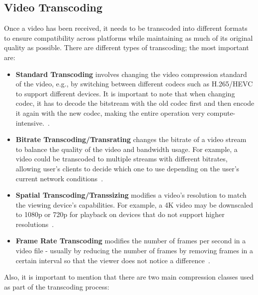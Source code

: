 \subsection{Video Transcoding}
Once a video has been received, it needs to be transcoded into different formats to ensure compatibility across platforms while maintaining as much of its original quality as possible. There are different types of transcoding; the most important are:

\begin{itemize}
    \item \textbf{Standard Transcoding} involves changing the video compression standard of the video, e.g., by switching between different codecs such as H.265/HEVC to support different devices. It is important to note that when changing codec, it has to decode the bitstream with the old codec first and then encode it again with the new codec, making the entire operation very compute-intensive.~\parencite{codec_transcoding}.
    \item \textbf{Bitrate Transcoding/Transrating} changes the bitrate of a video stream to balance the quality of the video and bandwidth usage. For example, a video could be transcoded to multiple streams with different bitrates, allowing user's clients to decide which one to use depending on the user's current network conditions~\parencite{transcoding}.
    \item \textbf{Spatial Transcoding/Transsizing} modifies a video's resolution to match the viewing device's capabilities. For example, a 4K video may be downscaled to 1080p or 720p for playback on devices that do not support higher resolutions~\parencite{cloud_streaming}.
    \item \textbf{Frame Rate Transcoding} modifies the number of frames per second in a video file - usually by reducing the number of frames by removing frames in a certain interval so that the viewer does not notice a difference~\parencite{transcoding}.
\end{itemize}

\noindent Also, it is important to mention that there are two main compression classes used as part of the transcoding process:

